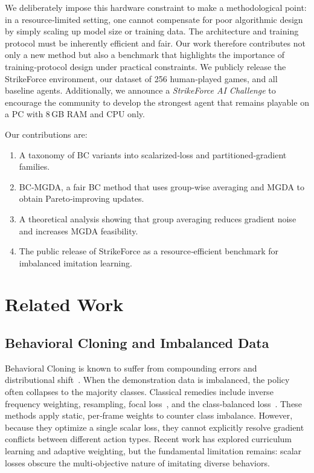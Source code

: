 \documentclass[conference]{IEEEtran}
\begin{document}
We deliberately impose this hardware constraint to make a methodological point: in a resource‑limited setting, one cannot compensate for poor algorithmic design by simply scaling up model size or training data. The architecture and training protocol must be inherently efficient and fair. Our work therefore contributes not only a new method but also a benchmark that highlights the importance of training‑protocol design under practical constraints. We publicly release the StrikeForce environment, our dataset of 256 human‑played games, and all baseline agents. Additionally, we announce a \emph{StrikeForce AI Challenge} to encourage the community to develop the strongest agent that remains playable on a PC with 8\,GB RAM and CPU only.

Our contributions are:
\begin{enumerate}
    \item A taxonomy of BC variants into scalarized‑loss and partitioned‑gradient families.
    \item BC‑MGDA, a fair BC method that uses group‑wise averaging and MGDA to obtain Pareto‑improving updates.
    \item A theoretical analysis showing that group averaging reduces gradient noise and increases MGDA feasibility.
    \item The public release of StrikeForce as a resource‑efficient benchmark for imbalanced imitation learning.
\end{enumerate}

\section{Related Work}
\subsection{Behavioral Cloning and Imbalanced Data}
Behavioral Cloning is known to suffer from compounding errors and distributional shift~\cite{ross2011reduction}. When the demonstration data is imbalanced, the policy often collapses to the majority classes. Classical remedies include inverse frequency weighting, resampling, focal loss~\cite{lin2017focal}, and the class‑balanced loss~\cite{cui2019class}. %
These methods apply static, per‑frame weights to counter class imbalance. However, because they optimize a single scalar loss, they cannot explicitly resolve gradient conflicts between different action types. Recent work has explored curriculum learning and adaptive weighting, but the fundamental limitation remains: scalar losses obscure the multi‑objective nature of imitating diverse behaviors.
\end{document}
